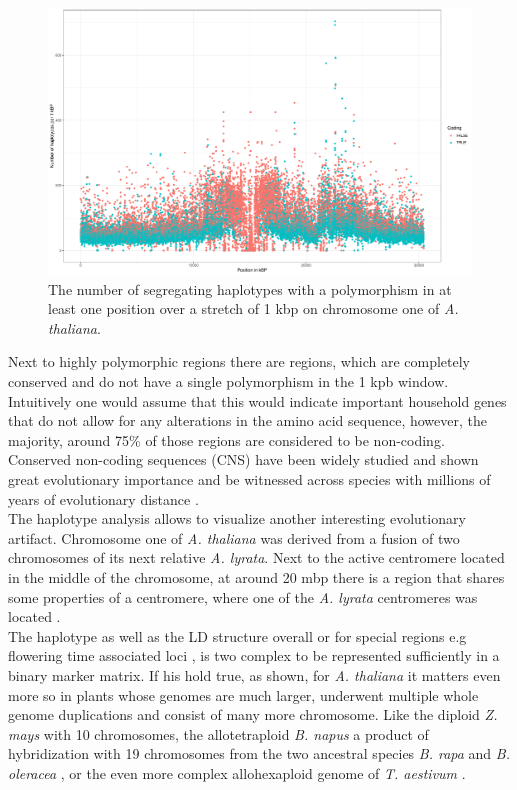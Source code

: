 \begin{figure}[H]
\centering 
\includegraphics[height=.55\textheight, width=1.1\textwidth]{Figures/chr1_hap}
\decoRule
\caption[Haplotype strutcture of chromosome 1 of \textit{A. thaliana}]{The number of
  segregating haplotypes with a polymorphism in at least one position over a stretch of 1
  kbp on chromosome one of \textit{A. thaliana}.}
\label{fig:chr1}
\end{figure}

Next to highly polymorphic regions there are regions, which are completely conserved and
do not have a single polymorphism in the 1 kpb window. Intuitively one would assume that
this would indicate important household genes that do not allow for any alterations in the
amino acid sequence, however, the majority, around 75\% of those regions are considered to
be non-coding. Conserved non-coding sequences (CNS) have been widely studied and shown
great evolutionary importance and be witnessed across species with millions of years of
evolutionary distance \cite{Burgess946}. \\
The haplotype analysis allows to visualize another interesting evolutionary
artifact. Chromosome one of \textit{A. thaliana} was derived from a fusion of two
chromosomes of its next relative \textit{A. lyrata}. Next to the active centromere located
in the middle of the chromosome, at around 20 mbp there is a region that shares some
properties of a centromere, where one of the \textit{A. lyrata} centromeres was
located \cite{koch2007evolution}. \\
The haplotype as well as the LD structure overall or for special regions e.g flowering
time associated loci \cite{li2014multiple}, is two complex to be represented sufficiently
in a binary marker matrix. If his hold true, as shown, for \textit{A. thaliana} it matters
even more so in plants whose genomes are much larger, underwent multiple whole genome
duplications and consist of many more chromosome. Like the diploid \textit{Z. mays} with
10 chromosomes, the allotetraploid \textit{B. napus} a product of hybridization with 19
chromosomes from the two ancestral species \textit{B. rapa} and \textit{B. oleracea}
\cite{liu2018brassica}, or the even more complex allohexaploid genome of
\textit{T. aestivum} \cite{international2018shifting}.

